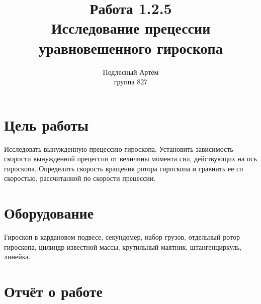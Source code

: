 \documentclass[a4paper, 12pt]{article}%
\author{Подлесный Артём \\ группа 827}
\title{Работа 1.2.5 \\ Исследование прецессии уравновешенного гироскопа}
\begin{document}
\maketitle
\section{Цель работы}
Исследовать вынужденную прецессию гироскопа. Установить зависимость скорости вынужденной прецессии от величины момента сил, действующих на ось гироскопа. Определить скорость вращения ротора гироскопа и сравнить ее со скоростью, рассчитанной по скорости прецессии.
\section{Оборудование}
Гироскоп в кардановом подвесе, секундомер, набор грузов, отдельный ротор гироскопа, цилиндр известной массы, крутильный маятник, штангенциркуль, линейка.
\section{Отчёт о работе}
\end{document}
